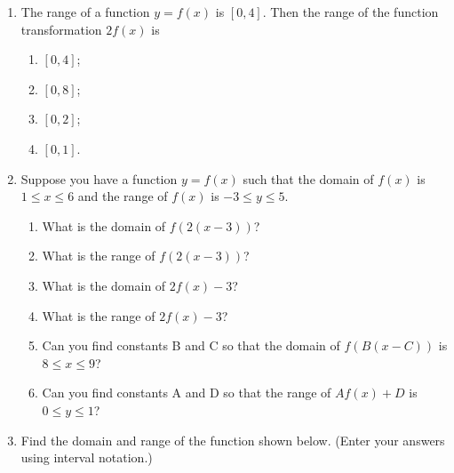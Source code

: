 \documentclass[11pt]{article}
\begin{document}
\begin{enumerate}
\begin{figure}[h]
\hspace*{\fill}
\end{figure}

\item The range of a function $y=f(x)$ is $[0,4]$. Then the range of the function transformation $2f\left( x\right)$ is 
\begin{enumerate}
\item $[0,4]$;
\item $[0,8]$;
\item $[0,2]$;
\item
 $[0,1]$.
\end{enumerate}

\item  Suppose you have a function $y= f(x)$ such that the domain of $f(x)$ is $1 \leq  x \leq  6$ and
the range of $f(x)$ is $-3 \leq  y \leq  5$. 
\begin{enumerate}
\item What is the domain of $f(2(x-3))$?
\item What is the range of $f(2(x-3))$?
\item What is the domain of $2f(x)-3$?
\item What is the range of $2f(x)-3$?
\item Can you find constants B and C so that the domain of $f(B(x-C))$  is $8 \leq  x \leq 9$?
\item Can you find constants A and D so that the range of $Af(x)+D$ is $0 \leq  y \leq  1$?
\end{enumerate}


\item Find the domain and range of the function shown below. (Enter your answers using interval notation.) 


\end{enumerate}
\end{document}
